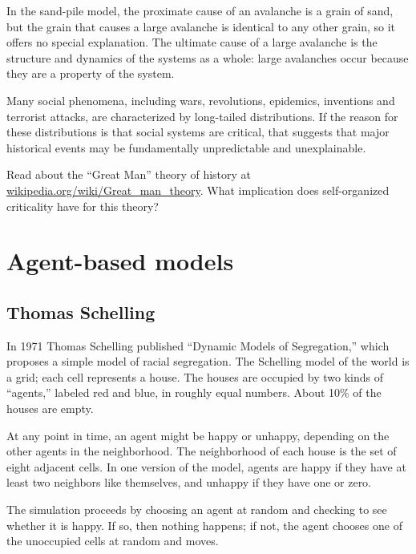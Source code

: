\documentclass[10pt]{book}
\begin{document}
In the sand-pile model, the proximate cause of an avalanche is
a grain of sand, but the grain that causes a large avalanche
is identical to any other grain, so it offers no special explanation.
The ultimate cause of a large avalanche is the structure and
dynamics of the systems as a whole: large avalanches occur because
they are a property of the system.

Many social phenomena, including wars, revolutions, epidemics,
inventions and terrorist attacks, are characterized by long-tailed
distributions.  If the reason for these distributions is that
social systems are critical, that suggests that major historical
events may be fundamentally unpredictable and unexplainable.

\begin{exercise}

Read about the ``Great Man'' theory of history at
\url{wikipedia.org/wiki/Great_man_theory}.  What implication
does self-organized criticality have for this theory?

\end{exercise}


\chapter{Agent-based models}
\label{agent-based}

\section{Thomas Schelling}

In 1971 Thomas Schelling published ``Dynamic Models of Segregation,''
which proposes a simple model of racial segregation.  The Schelling
model of the world is a grid; each cell represents a
house.  The houses are occupied by two kinds of ``agents,''
labeled red and blue, in roughly equal numbers.  About 10\% of the
houses are empty.

At any point in time, an agent might be happy or unhappy, depending
on the other agents in the neighborhood.
The neighborhood of each house is the set of
eight adjacent cells.
In one version of the model, agents are happy if they have at least
two neighbors like themselves, and unhappy if they have one or zero.

The simulation proceeds by choosing an agent at random and checking
to see whether it is happy.  If so, then nothing happens; if not,
the agent chooses one of the unoccupied cells at
random and moves.
\end{document}
